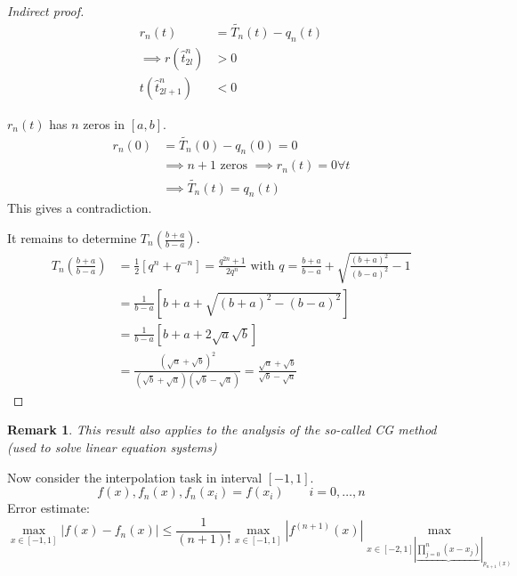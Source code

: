 \documentclass{article}
\newtheorem*{remark}{Remark}
\newcommand{\card}[1]{\left|#1\right|}
\begin{document}
\begin{proof}[Indirect proof]
  \begin{align*}
    r_n(t) &= \tilde{T_n}(t) - q_n(t) \\
    \implies r(\hat{t}_{2l}^n) &> 0 \\
    t(\hat{t}_{2l+1}^n) &< 0
  \end{align*}

  $r_n(t)$ has $n$ zeros in $[a,b]$.
  \begin{align*}
    r_n(0) &= \tilde{T_n}(0) - q_n(0) = 0 \\
      &\implies n+1 \text{ zeros } \implies r_n(t) = 0 \forall t \\
      &\implies \tilde{T_n}(t) = q_n(t)
  \end{align*}
  This gives a contradiction.

  It remains to determine $T_n\left(\frac{b+a}{b-a}\right)$.
  \begin{align*}
    T_n\left(\frac{b+a}{b-a}\right)
      &= \frac12\left[q^n + q^{-n}\right] = \frac{q^{2n} + 1}{2q^n} \text{ with } q = \frac{b+a}{b-a} + \sqrt{\frac{(b+a)^2}{(b-a)^2} - 1} \\
      &= \frac1{b-a} \left[b + a + \sqrt{(b + a)^2 - (b - a)^2}\right] \\
      &= \frac1{b-a} \left[b + a + 2 \sqrt a \sqrt b\right] \\
      &= \frac{(\sqrt a + \sqrt b)^2}{(\sqrt b + \sqrt a)(\sqrt b - \sqrt a)} = \frac{\sqrt a + \sqrt b}{\sqrt b - \sqrt a}
  \end{align*}
\end{proof}

\begin{remark}
  This result also applies to the analysis of the so-called CG method (used to solve linear equation systems)
\end{remark}

Now consider the interpolation task in interval $[-1,1]$.
\[ f(x), f_n(x), f_n(x_i) = f(x_i) \qquad i = 0, \dots, n \]
Error estimate:
\[ \max_{x \in [-1,1]} \card{f(x) - f_n(x)} \leq \frac{1}{(n+1)!} \max_{x \in [-1,1]} \card{f^{(n+1)}(x)} \max_{x \in [-2,1] \card{\underbrace{\prod_{j=0}^n (x - x_j)}}_{p_{n+1}(x)}} \]
\end{document}
